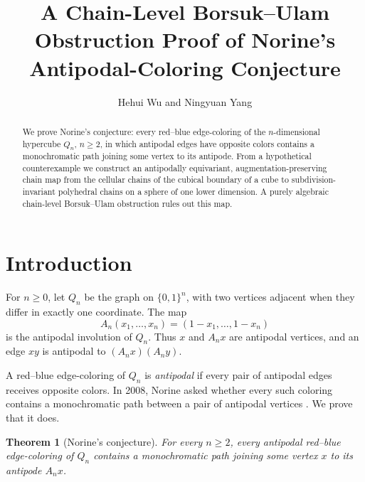 \documentclass[reqno,12pt]{amsart}
\newtheorem{theorem}{Theorem}[section]
\theoremstyle{definition}
\begin{document}
\title[]{A Chain-Level Borsuk--Ulam Obstruction Proof of Norine's Antipodal-Coloring Conjecture}

\author[]{Hehui Wu and Ningyuan Yang}

    \address[Hehui Wu]{Shanghai Center for Mathematical Sciences, Fudan University, Shanghai, China}

    \address[Ningyuan Yang]{School of Mathematical Sciences, Fudan University, Shanghai, China, and Extremal Combinatorics and Probability Group (ECOPRO), Institute for Basic Science (IBS), Daejeon, South Korea.}

\begin{abstract}
We prove Norine's conjecture: every red--blue edge-coloring of the
\(n\)-dimensional hypercube \(Q_n\), \(n\geq2\), in which antipodal
edges have opposite colors contains a monochromatic path joining some
vertex to its antipode.  From a hypothetical counterexample we
construct an antipodally equivariant, augmentation-preserving chain
map from the cellular chains of the cubical boundary of a cube to
subdivision-invariant polyhedral chains on a sphere of one lower
dimension.  A purely algebraic chain-level Borsuk--Ulam obstruction
rules out this map.
\end{abstract}

\maketitle

\section{Introduction}\label{sec:introduction}

For \(n\geq0\), let \(Q_n\) be the graph on \(\{0,1\}^n\), with two
vertices adjacent when they differ in exactly one coordinate.  The map
\[
 A_n(x_1,\ldots,x_n)=(1-x_1,\ldots,1-x_n)
\]
is the antipodal involution of \(Q_n\).  Thus \(x\) and \(A_nx\) are
antipodal vertices, and an edge \(xy\) is antipodal to
\((A_nx)(A_ny)\).

A red--blue edge-coloring of \(Q_n\) is \emph{antipodal} if every pair
of antipodal edges receives opposite colors.  In 2008, Norine asked
whether every such coloring contains a monochromatic path between a
pair of antipodal vertices \cite{Norine}.  We prove that it does.

\begin{theorem}[Norine's conjecture]\label{thm:main}
For every \(n\geq2\), every antipodal red--blue edge-coloring of
\(Q_n\) contains a monochromatic path joining some vertex \(x\) to
its antipode \(A_nx\).
\end{theorem}
\end{document}
